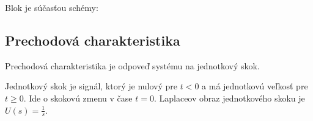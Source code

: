 \documentclass[a4paper, 10pt, ]{article}
\begin{document}
Blok je súčasťou schémy:
\begin{center}


    \vspace{-5mm}

	\label{sim_ICHSS1R}

    \vspace{-1mm}

\end{center}














\subsection{Prechodová charakteristika}


Prechodová charakteristika je odpoveď systému na jednotkový skok.

\bigskip

Jednotkový skok je signál, ktorý je nulový pre $t < 0$ a má jednotkovú veľkosť pre $t \geq 0$. Ide o skokovú zmenu v čase $t=0$. Laplaceov obraz jednotkového skoku je $U(s) = \frac{1}{s}$.
\end{document}
